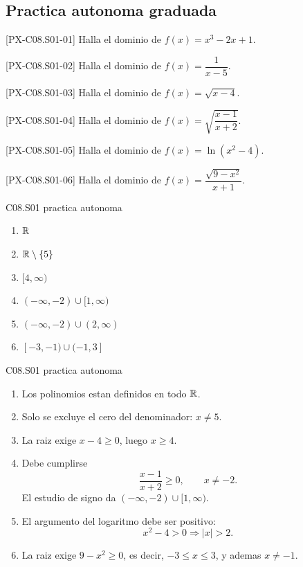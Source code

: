 \subsection*{Practica autonoma graduada}
\begin{exercise}{[PX-C08.S01-01] Halla el dominio de \(f(x)=x^3-2x+1\).}
\end{exercise}
\begin{exercise}{[PX-C08.S01-02] Halla el dominio de \(f(x)=\dfrac{1}{x-5}\).}
\end{exercise}
\begin{exercise}{[PX-C08.S01-03] Halla el dominio de \(f(x)=\sqrt{x-4}\).}
\end{exercise}
\begin{exercise}{[PX-C08.S01-04] Halla el dominio de \(f(x)=\sqrt{\dfrac{x-1}{x+2}}\).}
\end{exercise}
\begin{exercise}{[PX-C08.S01-05] Halla el dominio de \(f(x)=\ln(x^2-4)\).}
\end{exercise}
\begin{exercise}{[PX-C08.S01-06] Halla el dominio de \(f(x)=\dfrac{\sqrt{9-x^2}}{x+1}\).}
\end{exercise}

\begin{shortanswer}{C08.S01 practica autonoma}
\begin{enumerate}[label=\textbf{PX-C08.S01-\arabic*:}, leftmargin=*]
  \item \(\mathbb{R}\)
  \item \(\mathbb{R}\setminus\{5\}\)
  \item \([4,\infty)\)
  \item \((-\infty,-2)\cup[1,\infty)\)
  \item \((-\infty,-2)\cup(2,\infty)\)
  \item \([-3,-1)\cup(-1,3]\)
\end{enumerate}
\end{shortanswer}

\begin{fullsolution}{C08.S01 practica autonoma}
\begin{enumerate}[label=\textbf{PX-C08.S01-\arabic*:}, leftmargin=*]
  \item Los polinomios estan definidos en todo \(\mathbb{R}\).
  \item Solo se excluye el cero del denominador: \(x\neq 5\).
  \item La raiz exige \(x-4\geq 0\), luego \(x\geq 4\).
  \item Debe cumplirse
  \[
  \frac{x-1}{x+2}\geq 0,\qquad x\neq -2.
  \]
  El estudio de signo da \((-\infty,-2)\cup[1,\infty)\).
  \item El argumento del logaritmo debe ser positivo:
  \[
  x^2-4>0 \Longrightarrow |x|>2.
  \]
  \item La raiz exige \(9-x^2\geq 0\), es decir, \(-3\leq x\leq 3\), y ademas \(x\neq -1\).
\end{enumerate}
\end{fullsolution}

